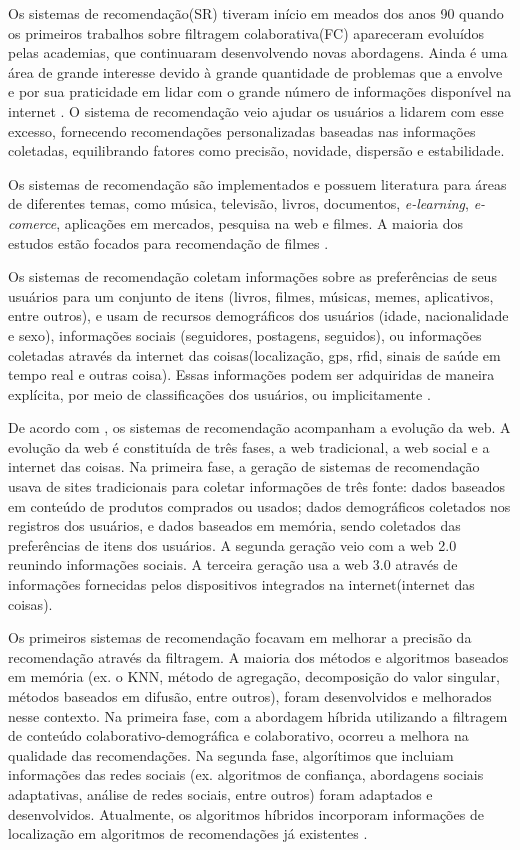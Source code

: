 Os sistemas de recomendação(SR) tiveram início em meados dos anos 90 
quando os primeiros trabalhos sobre filtragem colaborativa(FC) 
apareceram \cite{felferning2008} evoluídos pelas academias, 
que continuaram desenvolvendo novas abordagens. 
Ainda é uma área de grande interesse devido à grande quantidade de 
problemas que a envolve e por sua praticidade em lidar com o grande 
número de informações disponível na internet \cite{adomavicius2005}. 
O sistema de recomendação veio ajudar os usuários a lidarem com esse 
excesso, fornecendo recomendações personalizadas baseadas nas informações 
coletadas, equilibrando fatores como precisão, novidade, dispersão e 
estabilidade\cite{bobadilla2013}.


Os sistemas de recomendação são implementados e possuem literatura 
para áreas de diferentes temas, como música, televisão, livros, 
documentos, \emph{e-learning}, \emph{e-comerce}, aplicações em mercados, 
pesquisa na web e filmes. A maioria dos estudos estão focados 
para recomendação de filmes \cite{bobadilla2013}.
 
Os sistemas de recomendação coletam informações sobre as preferências 
de seus usuários para um conjunto de itens (livros, filmes, músicas, 
memes, aplicativos, entre outros), e usam de recursos demográficos dos 
usuários (idade, nacionalidade e sexo), informações sociais 
(seguidores, postagens, seguidos), ou informações coletadas através da 
internet das coisas(localização, gps, rfid, sinais de saúde em tempo 
real e outras coisa). Essas informações podem ser adquiridas de maneira 
explícita, por meio de classificações dos usuários, ou implicitamente 
\cite{bobadilla2013}.

De acordo com , os sistemas de recomendação 
acompanham a evolução da web. A evolução da web é constituída de três 
fases, a web tradicional, a web social e a internet das coisas. 
Na primeira fase, a geração de sistemas de recomendação usava de 
sites tradicionais para coletar informações de três fonte: dados 
baseados em conteúdo de produtos comprados ou usados; dados 
demográficos coletados nos registros dos usuários, e dados baseados em 
memória, sendo coletados das preferências de itens dos usuários. A segunda 
geração veio com a web 2.0 reunindo informações sociais. A terceira 
geração usa a web 3.0 através de informações fornecidas pelos dispositivos 
integrados na internet(internet das coisas).

Os primeiros sistemas de recomendação focavam em melhorar a precisão da 
recomendação através da filtragem. A maioria dos métodos e algoritmos 
baseados em memória (ex. o KNN, método de agregação, decomposição do valor 
singular, métodos baseados em difusão, entre outros), foram
desenvolvidos e melhorados nesse contexto. Na primeira fase, com a 
abordagem híbrida utilizando a filtragem de conteúdo 
colaborativo-demográfica e colaborativo, ocorreu a melhora na qualidade 
das recomendações. Na segunda fase, algorítimos que incluiam informações 
das redes sociais (ex. algoritmos de
confiança, abordagens sociais adaptativas, análise de redes sociais, 
entre outros) foram adaptados e 
desenvolvidos. Atualmente, os algoritmos híbridos incorporam informações 
de localização em algoritmos de recomendações já existentes \cite{bobadilla2013}. 

